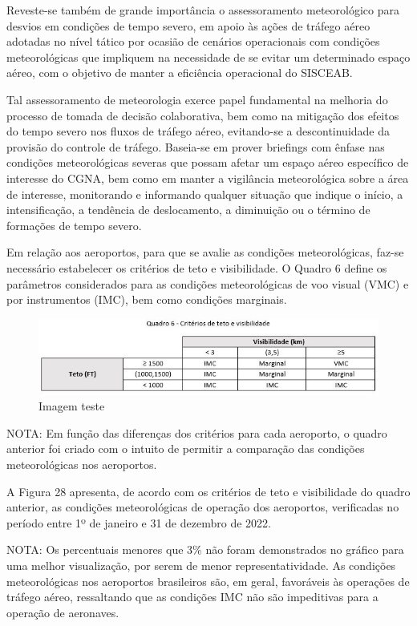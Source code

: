 \documentclass[
]{book}
\begin{document}
Reveste-se também de grande importância o assessoramento meteorológico para desvios em condições de tempo severo, em apoio às ações de tráfego aéreo adotadas no nível tático por ocasião de cenários operacionais com condições meteorológicas que impliquem na necessidade de se evitar um determinado espaço aéreo, com o objetivo de manter a eficiência operacional do SISCEAB.

Tal assessoramento de meteorologia exerce papel fundamental na melhoria do processo de tomada de decisão colaborativa, bem como na mitigação dos efeitos do tempo severo nos fluxos de tráfego aéreo, evitando-se a descontinuidade da provisão do controle de tráfego. Baseia-se em prover briefings com ênfase nas condições meteorológicas severas que possam afetar um espaço aéreo específico de interesse do CGNA, bem como em manter a vigilância meteorológica sobre a área de interesse, monitorando e informando qualquer situação que indique o início, a intensificação, a tendência de deslocamento, a diminuição ou o término de formações de tempo severo.

Em relação aos aeroportos, para que se avalie as condições meteorológicas, faz-se necessário estabelecer os critérios de teto e visibilidade. O Quadro 6 define os parâmetros considerados para as condições meteorológicas de voo visual (VMC) e por instrumentos (IMC), bem como condições marginais.

\begin{figure}
\centering
\includegraphics{imagens/fig31.jpg}
\caption{Imagem teste}
\end{figure}

NOTA: Em função das diferenças dos critérios para cada aeroporto, o quadro anterior foi criado com o intuito de permitir a comparação das condições meteorológicas nos aeroportos.

A Figura 28 apresenta, de acordo com os critérios de teto e visibilidade do quadro anterior, as condições meteorológicas de operação dos aeroportos, verificadas no período entre 1º de janeiro e 31 de dezembro de 2022.

NOTA: Os percentuais menores que 3\% não foram demonstrados no gráfico para uma melhor visualização, por serem de menor representatividade. As condições meteorológicas nos aeroportos brasileiros são, em geral, favoráveis às operações de tráfego aéreo, ressaltando que as condições IMC não são impeditivas para a operação de aeronaves.
\end{document}
